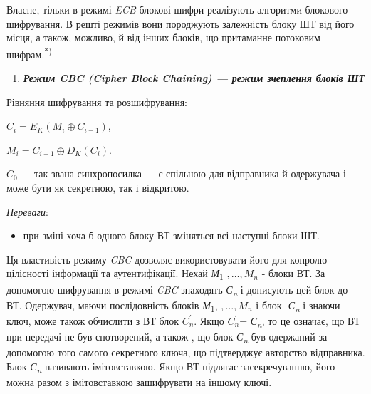 Власне, тільки в режимі \textit{ECB }блокові шифри реалізують алгоритми
блокового шифрування. В решті режимів  вони породжують залежність блоку ШТ від
його місця, а також, можливо, й від інших блоків, що притаманне потоковим
шифрам.\textsuperscript{*)}


\bigskip


\bigskip

\liststyleWWviiiNumxxi
\begin{enumerate}
\item {\bfseries\itshape
Режим CBC (Cipher Block Chaining) --- режим зчеплення блоків ШТ}
\end{enumerate}

\bigskip

Рівняння шифрування та розшифрування:

{\centering
 $C_{i}=E_{K}(M_i{\oplus}C_{i-1})$,
\par}

{\centering
 $M_{i}=C_{i-1}{\oplus}D_{K}(C_i)$.
\par}

 $C_0$ --- так звана синхропосилка --- є спільною для відправника й одержувача
і може бути як секретною, так і відкритою.


\bigskip

\textit{Переваги}:

\liststyleWWviiiNumxxvii
\begin{itemize}
\item при зміні хоча б одного блоку ВТ зміняться всі наступні блоки ШТ.
\end{itemize}
Ця властивість режиму \textit{CBC} дозволяє використовувати його для конролю
цілісності інформації та аутентифікації. Нехай \textit{М}\textsubscript{1}
$,\dots,M_n$\textsubscript{ }{}- блоки ВТ. За
допомогою шифрування в режимі \textit{CBC }знаходять\textit{
С}\textit{\textsubscript{n}} і дописують цей блок до ВТ. Одержувач, маючи
послідовність блоків \textit{М}\textsubscript{1},
$,\dots,M_n$\textsubscript{ }і блок $ $
\textit{С}\textit{\textsubscript{n}} і знаючи ключ, може також обчислити з ВТ
блок  ${C}_{n}^{'}$. Якщо  ${C}_n^{'}$=\textit{
С}\textit{\textsubscript{n}}, то це означає, що ВТ при передачі не був
спотворений, а також , що блок \textit{С}\textit{\textsubscript{n}} був
одержаний за допомогою того самого секретного ключа, що підтверджує авторство
відправника. Блок \textit{С}\textit{\textsubscript{n}} називають імітовставкою.
Якщо ВТ підлягає засекречуванню, його можна разом з імітовставкою зашифрувати
на іншому ключі.

